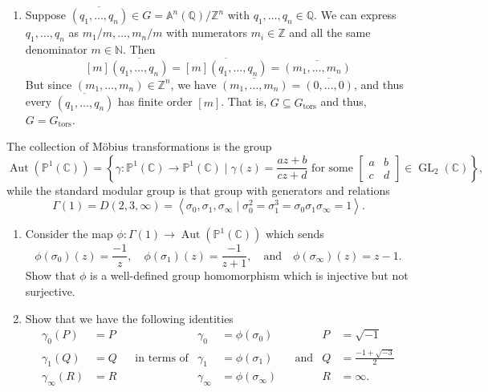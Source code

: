 \documentclass[12 pt, letterpaper]{hmcpset}
\begin{document}
\begin{solution}
\begin{enumerate}
			Since $[m](m_{1}, \dots, m_{n}) = (0, \dots, 0)$, we must have $m m_{i} = 0$ for each $i \in \{ 1, \dots, n \}$. Thus, $m = 0$ or $m_{i} = 0$. We know $m \neq 0$, so we must have $m_{i} = 0$ for each $i \in \{ 1, \dots, n \}$ --- we have $(m_{1}, \dots, m_{n}) = (0, \dots, 0)$. Then $\mathbb{Z}^{n}_{\text{tors}} = \{ (0, \dots, 0) \}$, and thus, $\mathbb{Z}^{n}$ is a torsion-free abelian group.
		\item Suppose $\overline{(q_{1}, \dots, q_{n})} \in G = \mathbb{A}^{n}(\mathbb{Q}) / \mathbb{Z}^{n}$ with $q_{1}, \dots, q_{n} \in \mathbb{Q}$. We can express $q_{1}, \dots, q_{n}$ as $m_{1}/m, \dots, m_{n}/m$ with numerators $m_{i} \in \mathbb{Z}$ and all the same denominator $m \in \mathbb{N}$. Then
			\[
				[m] \overline{(q_{1}, \dots, q_{n})} = \overline{[m](q_{1}, \dots, q_{n})} = \overline{(m_{1}, \dots, m_{n})}
			\]
			But since $(m_{1}, \dots, m_{n}) \in \mathbb{Z}^{n}$, we have $\overline{(m_{1}, \dots, m_{n})} = \overline{(0, \dots, 0)}$, and thus every $\overline{(q_{1}, \dots, q_{n})}$ has finite order $[m]$. That is, $G \subseteq G_{\text{tors}}$ and thus, $G = G_{\text{tors}}$.
	\end{enumerate}
\end{solution}

\pagebreak

\begin{problem}[Problem 2.]
	The collection of M\"{o}bius transformations is the group
	\[
		\operatorname{Aut}(\mathbb{P}^{1}(\mathbb{C})) = \left \{ \gamma : \mathbb{P}^{1}(\mathbb{C}) \to \mathbb{P}^{1}(\mathbb{C}) \mid \gamma(z) = \frac{az + b}{cz + d} \text{ for some } \begin{bmatrix}
				a & b \\
				c & d
		\end{bmatrix} \in \operatorname{GL}_{2}(\mathbb{C}) \right \},
	\]
	while the standard modular group is that group with generators and relations
	\[
		\Gamma(1) = D(2, 3, \infty) = \left < \sigma_{0}, \sigma_{1}, \sigma_{\infty} \mid \sigma_{0}^{2} = \sigma_{1}^{3} = \sigma_{0} \sigma_{1} \sigma_{\infty} = 1 \right >.
	\]
	\begin{enumerate}
		\item Consider the map $\phi : \Gamma(1) \to \operatorname{Aut}(\mathbb{P}^{1}(\mathbb{C}))$ which sends
			\[
				\phi(\sigma_{0})(z) = \frac{- 1}{z}, \quad \phi(\sigma_{1})(z) = \frac{- 1}{z + 1}, \quad \text{and} \quad \phi(\sigma_{\infty})(z) = z - 1.
			\]
			Show that $\phi$ is a well-defined group homomorphism which is injective but not surjective.
		\item Show that we have the following identities
			\begin{align*}
				\gamma_{0}(P) & = P & & & \gamma_{0} & = \phi(\sigma_{0}) & & & P & = \sqrt{-1} \\
				\gamma_{1} (Q) & = Q & & \text{in terms of} & \gamma_{1} & = \phi(\sigma_{1}) & & \text{and} & Q & = \frac{-1 + \sqrt{-3}}{2} \\
				\gamma_{\infty}(R) & = R & & & \gamma_{\infty} & = \phi(\sigma_{\infty}) & & & R & = \infty.
			\end{align*}
	\end{enumerate}
\end{problem}
\end{document}
